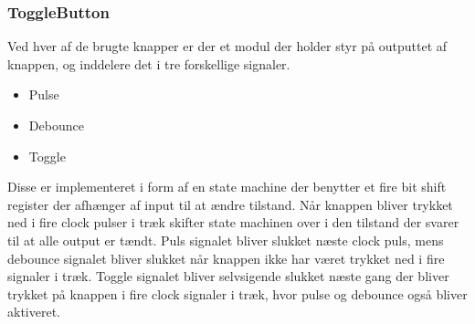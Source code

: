 \subsubsection{ToggleButton}

Ved hver af de brugte knapper er der et modul der holder styr på outputtet af knappen, og inddelere det i tre forskellige signaler.

\begin{itemize}[noitemsep]
\item Pulse
\item Debounce
\item Toggle
\end{itemize}

Disse er implementeret i form af en state machine der benytter et fire bit shift register der afhænger af input til at ændre tilstand. Når knappen bliver trykket ned i fire clock pulser i træk skifter state machinen over i den tilstand der svarer til at alle output er tændt. Puls signalet bliver slukket næste clock puls, mens debounce signalet bliver slukket når knappen ikke har været trykket ned i fire signaler i træk. Toggle signalet bliver selvsigende slukket næste gang der bliver trykket på knappen i fire clock signaler i træk, hvor pulse og debounce også bliver aktiveret.

